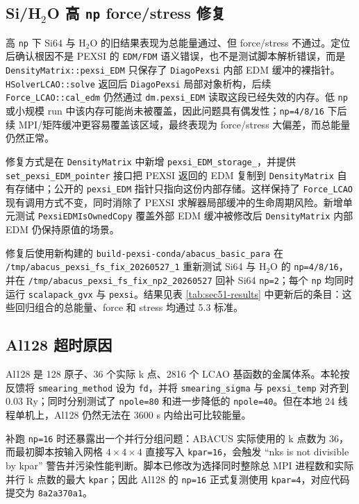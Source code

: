 \documentclass[a4paper,11pt]{article}
\newcommand{\code}[1]{\texttt{#1}}
\begin{document}
\subsection{Si/H\(_2\)O 高 \code{np} force/stress 修复}

高 \code{np} 下 Si64 与 H\(_2\)O 的旧结果表现为总能量通过、但 force/stress 不通过。定位后确认根因不是 PEXSI 的 \code{EDM/FDM} 语义错误，也不是测试脚本解析错误，而是 \code{DensityMatrix::pexsi\_EDM} 只保存了 \code{DiagoPexsi} 内部 EDM 缓冲的裸指针。\code{HSolverLCAO::solve} 返回后 \code{DiagoPexsi} 局部对象析构，后续 \code{Force\_LCAO::cal\_edm} 仍然通过 \code{dm.pexsi\_EDM} 读取这段已经失效的内存。低 \code{np} 或小规模 run 中该内存可能尚未被覆盖，因此问题具有偶发性；\code{np=4/8/16} 下后续 MPI/矩阵缓冲更容易覆盖该区域，最终表现为 force/stress 大偏差，而总能量仍然正常。

修复方式是在 \code{DensityMatrix} 中新增 \code{pexsi\_EDM\_storage\_}，并提供 \code{set\_pexsi\_EDM\_pointer} 接口把 PEXSI 返回的 EDM 复制到 \code{DensityMatrix} 自有存储中；公开的 \code{pexsi\_EDM} 指针只指向这份内部存储。这样保持了 \code{Force\_LCAO} 现有调用方式不变，同时消除了 PEXSI 求解器局部缓冲的生命周期风险。新增单元测试 \code{PexsiEDMIsOwnedCopy} 覆盖外部 EDM 缓冲被修改后 \code{DensityMatrix} 内部 EDM 仍保持原值的场景。

修复后使用新构建的 \code{build-pexsi-conda/abacus\_basic\_para} 在 \code{/tmp/abacus\_pexsi\_fs\_fix\_20260527\_1} 重新测试 Si64 与 H\(_2\)O 的 \code{np=4/8/16}，并在 \code{/tmp/abacus\_pexsi\_fs\_fix\_np2\_20260527} 回补 Si64 \code{np=2}；每个 \code{np} 均同时运行 \code{scalapack\_gvx} 与 \code{pexsi}。结果见表 \ref{tab:sec51-results} 中更新后的条目：这些回归组合的总能量、force 和 stress 均通过 5.3 标准。

\subsection{Al128 超时原因}

Al128 是 128 原子、36 个实际 k 点、2816 个 LCAO 基函数的金属体系。本轮按反馈将 \code{smearing\_method} 设为 \code{fd}，并将 \code{smearing\_sigma} 与 \code{pexsi\_temp} 对齐到 0.03 Ry；同时分别测试了 \code{npole=80} 和进一步降低的 \code{npole=40}。但在本地 24 线程单机上，Al128 仍然无法在 3600 s 内给出可比较能量。

补跑 \code{np=16} 时还暴露出一个并行分组问题：ABACUS 实际使用的 k 点数为 36，而最初脚本按输入网格 \(4\times4\times4\) 直接写入 \code{kpar=16}，会触发 ``nks is not divisible by kpar'' 警告并污染性能判断。脚本已修改为选择同时整除总 MPI 进程数和实际并行 k 点数的最大 \code{kpar}；因此 Al128 的 \code{np=16} 正式复测使用 \code{kpar=4}，对应代码提交为 \code{8a2a370a1}。
\end{document}
